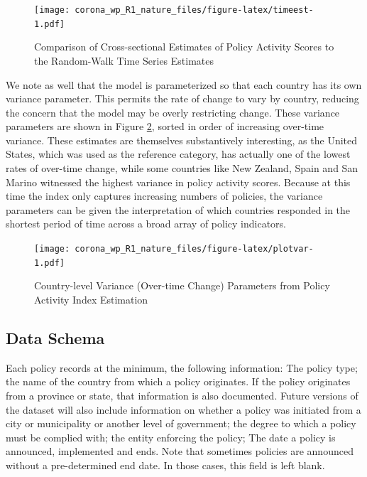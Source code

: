 \documentclass[]{article}
\begin{document}
\begin{figure}
\centering
\texttt{[image: corona\_wp\_R1\_nature\_files/figure-latex/timeest-1.pdf]}
\caption{\label{fig:timeest}Comparison of Cross-sectional Estimates of Policy Activity Scores to the Random-Walk Time Series Estimates}
\end{figure}

We note as well that the model is parameterized so that each country has its own variance parameter. This permits the rate of change to vary by country, reducing the concern that the model may be overly restricting change. These variance parameters are shown in Figure \ref{fig:plotvar}, sorted in order of increasing over-time variance. These estimates are themselves substantively interesting, as the United States, which was used as the reference category, has actually one of the lowest rates of over-time change, while some countries like New Zealand, Spain and San Marino witnessed the highest variance in policy activity scores. Because at this time the index only captures increasing numbers of policies, the variance parameters can be given the interpretation of which countries responded in the shortest period of time across a broad array of policy indicators.

\begin{figure}
\centering
\texttt{[image: corona\_wp\_R1\_nature\_files/figure-latex/plotvar-1.pdf]}
\caption{\label{fig:plotvar}Country-level Variance (Over-time Change) Parameters from Policy Activity Index Estimation}
\end{figure}

\hypertarget{data-schema}{%
\subsection*{Data Schema}\label{data-schema}}

Each policy records at the minimum, the following information: The policy type; the name of the country from which a policy originates. If the policy originates from a province or state, that information is also documented. Future versions of the dataset will also include information on whether a policy was initiated from a city or municipality or another level of government; the degree to which a policy must be complied with; the entity enforcing the policy; The date a policy is announced, implemented and ends. Note that sometimes policies are announced without a pre-determined end date. In those cases, this field is left blank.
\end{document}
